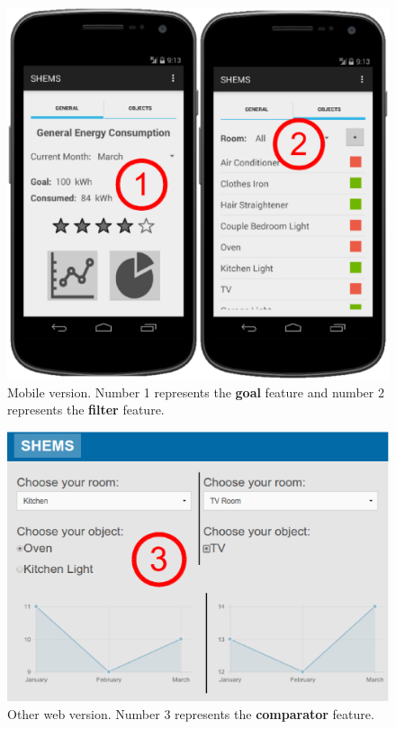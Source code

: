 \documentclass{chi-ext}
\begin{document}
{\begin{figure}
  \begin{center}
  \includegraphics[width=\marginparwidth]{images/mobile_goal-filter.eps}
  \caption{Mobile version. Number 1 represents the \textbf{goal} feature and number 2 represents the \textbf{filter} feature.}
  \label{fig:mobileprint}
  \end{center}  
\end{figure}

\begin{figure}
  \begin{center}
  \includegraphics[width=\marginparwidth]{images/web1_comparator.eps}
  \caption{Other web version. Number 3 represents the \textbf{comparator} feature.}
  \label{fig:web1print}
  \end{center}  
\end{figure}
}
\end{document}
